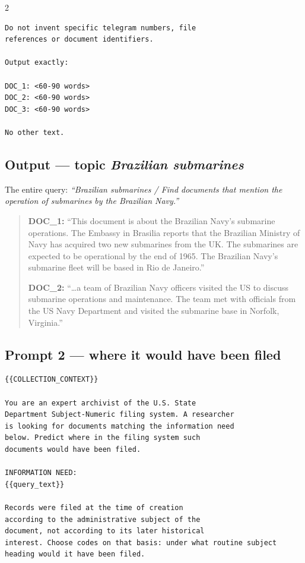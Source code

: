 \documentclass[a4paper,11pt]{article}
\begin{document}
\begin{multicols}{2}
{\begin{verbatim}
Do not invent specific telegram numbers, file
references or document identifiers.

Output exactly:

DOC_1: <60-90 words>
DOC_2: <60-90 words>
DOC_3: <60-90 words>

No other text.
\end{verbatim}
}

\subsection*{Output --- topic \emph{Brazilian submarines}}

The entire query: \emph{``Brazilian submarines / Find documents that mention the operation of
submarines by the Brazilian Navy.''}

\begin{quote}
\textbf{DOC\_1:} ``This document is about the Brazilian Navy's submarine operations. The
Embassy in Brasilia reports that the Brazilian Ministry of Navy has acquired two new
submarines from the UK. The submarines are expected to be operational by the end of 1965.
The Brazilian Navy's submarine fleet will be based in Rio de Janeiro.''

\textbf{DOC\_2:} ``\ldots a team of Brazilian Navy officers visited the US to discuss
submarine operations and maintenance. The team met with officials from the US Navy
Department and visited the submarine base in Norfolk, Virginia.''
\end{quote}

\subsection*{Prompt 2 --- where it would have been filed}

{\scriptsize
\begin{verbatim}
{{COLLECTION_CONTEXT}}

You are an expert archivist of the U.S. State
Department Subject-Numeric filing system. A researcher
is looking for documents matching the information need
below. Predict where in the filing system such
documents would have been filed.

INFORMATION NEED:
{{query_text}}

Records were filed at the time of creation
according to the administrative subject of the
document, not according to its later historical
interest. Choose codes on that basis: under what routine subject
heading would it have been filed.


\end{verbatim}}
\end{multicols}
\end{document}

